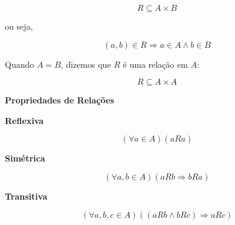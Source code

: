 \documentclass[12pt,a4paper]{article}
\begin{document}
\[
R \subseteq A \times B
\]

ou seja,

\[
(a,b) \in R \Rightarrow a \in A \land b \in B
\]

Quando $A=B$, dizemos que $R$ é uma relação em $A$:

\[
R \subseteq A \times A
\]

\vspace{0.3cm}

\textbf{Propriedades de Relações}

\textbf{Reflexiva}

\[
(\forall a \in A)(aRa)
\]

\textbf{Simétrica}

\[
(\forall a,b \in A)(aRb \Rightarrow bRa)
\]

\textbf{Transitiva}

\[
(\forall a,b,c \in A)((aRb \land bRc) \Rightarrow aRc)
\]
\end{document}
